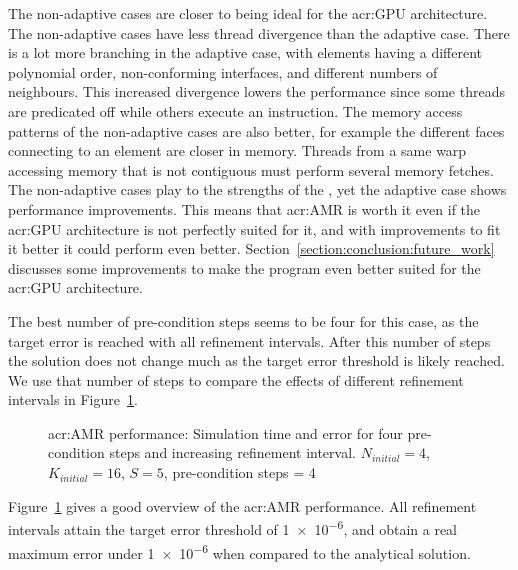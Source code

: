 The non-adaptive cases are closer to being ideal for the \acrshort{acr:GPU} architecture. The
non-adaptive cases have less thread divergence than the adaptive case. There is a lot more branching
in the adaptive case, with elements having a different polynomial order, non-conforming interfaces,
and different numbers of neighbours. This increased divergence lowers the performance since some
threads are predicated off while others execute an instruction. The memory access patterns of the
non-adaptive cases are also better, for example the different faces connecting to an element are
closer in memory. Threads from a same warp accessing memory that is not contiguous must perform
several memory fetches. The non-adaptive cases play to the strengths of the ,
yet the adaptive case shows performance improvements. This means that \acrshort{acr:AMR} is worth it
even if the \acrshort{acr:GPU} architecture is not perfectly suited for it, and with improvements to
fit it better it could perform even better. Section~\ref{section:conclusion:future_work} discusses
some improvements to make the program even better suited for the \acrshort{acr:GPU} architecture.

The best number of pre-condition steps seems to be four for this case, as the target error is
reached with all refinement intervals. After this number of steps the solution does not change much
as the target error threshold is likely reached. We use that number of steps to compare the effects
of different refinement intervals in Figure~\ref{fig:adaptivity_efficiency_C4}.

\begin{figure}[H]
    \centering
    \hfill
    \caption{\Acrlong{acr:AMR} performance: Simulation time and error for four pre-condition steps and increasing refinement interval. \(N_{initial} = 4\), \(K_{initial} = 16\), \(S = 5\), pre-condition steps = 4}\label{fig:adaptivity_efficiency_C4}
\end{figure}

Figure~\ref{fig:adaptivity_efficiency_C4} gives a good overview of the \acrshort{acr:AMR}
performance. All refinement intervals attain the target error threshold of \num{1e-6}, and obtain a
real maximum error under \num{1e-6} when compared to the analytical solution. 

